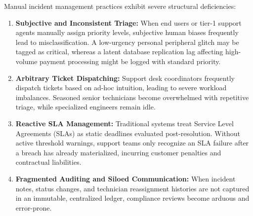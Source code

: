 \documentclass[11pt,a4paper,oneside]{report}
\begin{document}
Manual incident management practices exhibit severe structural deficiencies:
\begin{enumerate}
    \item \textbf{Subjective and Inconsistent Triage:} When end users or tier-1 support agents manually assign priority levels, subjective human biases frequently lead to misclassification. A low-urgency personal peripheral glitch may be tagged as critical, whereas a latent database replication lag affecting high-volume payment processing might be logged with standard priority.
    \item \textbf{Arbitrary Ticket Dispatching:} Support desk coordinators frequently dispatch tickets based on ad-hoc intuition, leading to severe workload imbalances. Seasoned senior technicians become overwhelmed with repetitive triage, while specialized engineers remain idle.
    \item \textbf{Reactive SLA Management:} Traditional systems treat Service Level Agreements (SLAs) as static deadlines evaluated post-resolution. Without active threshold warnings, support teams only recognize an SLA failure after a breach has already materialized, incurring customer penalties and contractual liabilities.
    \item \textbf{Fragmented Auditing and Siloed Communication:} When incident notes, status changes, and technician reassignment histories are not captured in an immutable, centralized ledger, compliance reviews become arduous and error-prone.
\end{enumerate}
\end{document}
